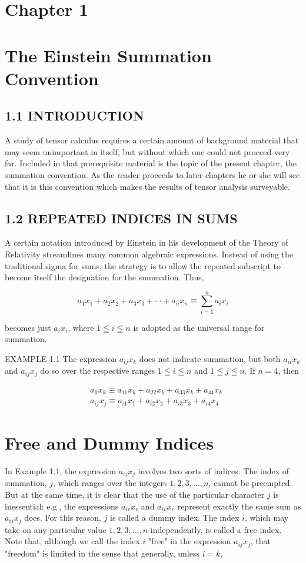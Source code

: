\documentclass[10pt]{article}
\begin{document}
\section*{Chapter 1}
\section*{The Einstein Summation Convention}
\subsection*{1.1 INTRODUCTION}
A study of tensor calculus requires a certain amount of background material that may seem unimportant in itself, but without which one could not proceed very far. Included in that prerequisite material is the topic of the present chapter, the summation convention. As the reader proceeds to later chapters he or she will see that it is this convention which makes the results of tensor analysis surveyable.

\subsection*{1.2 REPEATED INDICES IN SUMS}
A certain notation introduced by Einstein in his development of the Theory of Relativity streamlines many common algebraic expressions. Instead of using the traditional sigma for sums, the strategy is to allow the repeated subscript to become itself the designation for the summation. Thus,

$$
a_{1} x_{1}+a_{2} x_{2}+a_{3} x_{3}+\cdots+a_{n} x_{n} \equiv \sum_{i=1}^{n} a_{i} x_{i}
$$

becomes just $a_{i} x_{i}$, where $1 \leqq i \leqq n$ is adopted as the universal range for summation.

EXAMPLE 1.1 The expression $a_{i j} x_{k}$ does not indicate summation, but both $a_{i i} x_{k}$ and $a_{i j} x_{j}$ do so over the respective ranges $1 \leqq i \leqq n$ and $1 \leqq j \leqq n$. If $n=4$, then

$$
\begin{aligned}
& a_{\mathrm{ii}} x_{k} \equiv a_{11} x_{k}+a_{22} x_{k}+a_{33} x_{k}+a_{44} x_{k} \\
& a_{i j} x_{j} \equiv a_{i 1} x_{1}+a_{i 2} x_{2}+a_{i 3} x_{3}+a_{i 4} x_{4}
\end{aligned}
$$

\section*{Free and Dummy Indices}
In Example 1.1, the expression $a_{i j} x_{j}$ involves two sorts of indices. The index of summation, $j$, which ranges over the integers $1,2,3, \ldots, n$, cannot be preempted. But at the same time, it is clear that the use of the particular character $j$ is inessential; e.g., the expressions $a_{i r} x_{r}$ and $a_{i v} x_{v}$ represent exactly the same sum as $a_{i j} x_{j}$ does. For this reason, $j$ is called a dummy index. The index $i$, which may take on any particular value $1,2,3, \ldots, n$ independently, is called a free index. Note that, although we call the index $i$ "free" in the expression $a_{i j} x_{j}$, that "freedom" is limited in the sense that generally, unless $i=k$,
\end{document}

